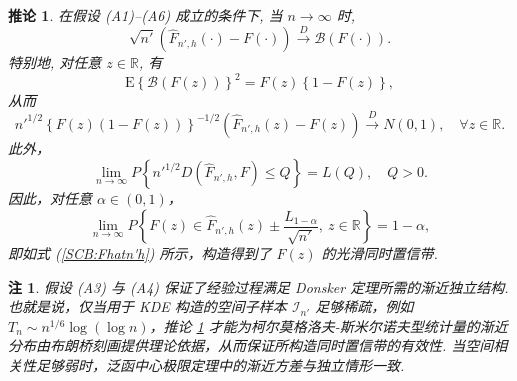 \documentclass[a4paper,openay,14pt]{ctexbook}
\numberwithin{equation}{section}
\numberwithin{lem}{section}
\newtheorem{coro}[theorem]{推论}%
\newtheorem{rema}[theorem]{注}%
\begin{document}
\begin{coro} \label{corollary:KDESCB}
在假设 (A1)–(A6) 成立的条件下, 当 $n \to \infty$ 时,
\[
\sqrt{n'}\left( \hat{F}_{n',h}(\cdot) - F(\cdot) \right)
\overset{D}{\rightarrow} \mathcal{B}(F(\cdot)).
\]
特别地, 对任意 $z \in \mathbb{R}$, 有
\[
\mathrm{E}\left\{ \mathcal{B}(F(z)) \right\}^2
= F(z)\left\{1 - F(z)\right\},
\]
从而
\[
n'^{1/2}\left\{F(z)(1 - F(z))\right\}^{-1/2}
\left( \hat{F}_{n',h}(z) - F(z) \right)
\overset{D}{\rightarrow} N(0,1), \quad \forall z \in \mathbb{R}.
\]
此外，
\[
\lim_{n \to \infty}
P\left\{ n'^{1/2} D\left(\hat{F}_{n',h}, F\right) \le Q \right\}
= L(Q), \quad Q > 0.
\]
因此，对任意 $\alpha \in (0,1)$，
\[
\lim_{n \to \infty}
P\left\{ F(z) \in \hat{F}_{n',h}(z)
\pm \frac{L_{1-\alpha}}{\sqrt{n'}},
\ z \in \mathbb{R} \right\}
= 1 - \alpha,
\]
即如式 (\ref{SCB:Fhatn'h}) 所示，构造得到了 $F(z)$ 的光滑同时置信带.
\end{coro}

\begin{rema}
假设 (A3) 与 (A4) 保证了经验过程满足 Donsker 定理所需的渐近独立结构. 也就是说，仅当用于 KDE 构造的空间子样本 $\mathcal{I}_{n'}$ 足够稀疏，例如 $T_n \sim n^{1/6}\log(\log n)$，推论 \ref{corollary:KDESCB} 才能为柯尔莫格洛夫-斯米尔诺夫型统计量的渐近分布由布朗桥刻画提供理论依据，从而保证所构造同时置信带的有效性. 当空间相关性足够弱时，泛函中心极限定理中的渐近方差与独立情形一致.
\end{rema}
\end{document}
